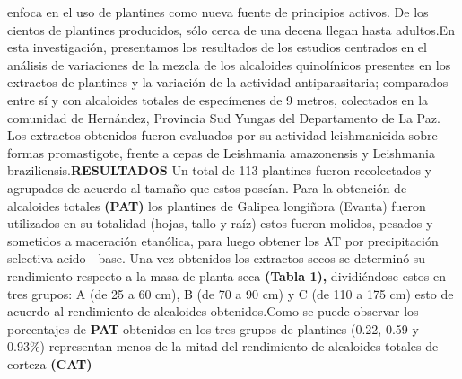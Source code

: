 \documentclass{article}
\begin{document}
{enfoca en el uso de plantines como nueva fuente de principios activos. De los cientos de plantines producidos, sólo cerca de una decena llegan hasta adultos.}{En esta investigación, presentamos los resultados de los estudios centrados en el análisis de variaciones de la mezcla de los alcaloides quinolínicos presentes en los extractos de plantines y la variación de la actividad antiparasitaria; comparados entre sí y con alcaloides totales de especímenes de 9 metros, colectados en la comunidad de Hernández, Provincia Sud Yungas del Departamento de La Paz. Los extractos obtenidos fueron evaluados por su actividad leishmanicida sobre formas promastigote, frente a cepas de Leishmania amazonensis y Leishmania braziliensis.}{\textbf{RESULTADOS}
}{Un total de 113 plantines fueron recolectados y agrupados de acuerdo al tamaño que estos poseían. Para la obtención de alcaloides totales \textbf{(PAT) }
los plantines de Galipea longiñora (Evanta) fueron utilizados en su totalidad (hojas, tallo y raíz) estos fueron molidos, pesados y sometidos a maceración etanólica, para luego obtener los AT por precipitación selectiva acido - base. Una vez obtenidos los extractos secos se determinó su rendimiento respecto a la masa de planta seca \textbf{(Tabla 1), }
dividiéndose estos en tres grupos: A (de 25 a 60 cm), B (de 70 a 90 cm) y C (de 110 a 175 cm) esto de acuerdo al rendimiento de alcaloides obtenidos.}{Como se puede observar los porcentajes de \textbf{PAT }
obtenidos en los tres grupos de plantines (0.22, 0.59 y 0.93\%) representan menos de la mitad del rendimiento de alcaloides totales de corteza \textbf{(CAT) }
}
\end{document}
